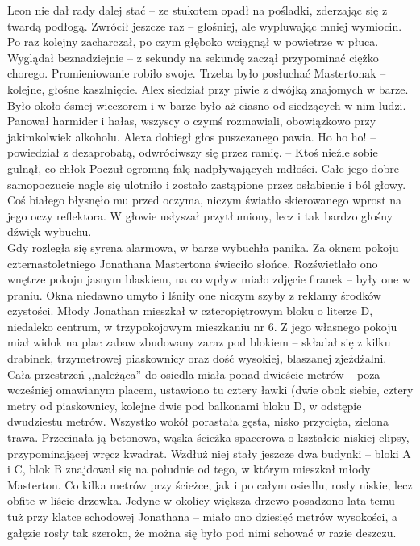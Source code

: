 \documentclass[../MAIN.tex]{subfiles}
\begin{document}
Leon nie dał rady dalej stać -- ze stukotem opadł na pośladki, zderzając się z twardą podłogą. Zwrócił jeszcze raz -- głośniej, ale wypluwając mniej wymiocin. Po raz kolejny zacharczał, po czym głęboko wciągnął w powietrze w płuca. Wyglądał beznadziejnie -- z sekundy na sekundę zaczął przypominać ciężko chorego. Promieniowanie robiło swoje.
\sx Trzeba było posłuchać Mastertona\3k -- kolejne, głośne kaszlnięcie.
\qd
Alex siedział przy piwie z dwójką znajomych w barze. Było około ósmej wieczorem i w barze było aż ciasno od siedzących w nim ludzi. Panował harmider i hałas, wszyscy o czymś rozmawiali, obowiązkowo przy jakimkolwiek alkoholu. Alexa dobiegł głos puszczanego pawia.
\sx Ho ho ho! -- powiedział z dezaprobatą, odwróciwszy się przez ramię. -- Ktoś nieźle sobie gulnął, co chło\3k \qd
Poczuł ogromną falę nadpływających mdłości. Całe jego dobre samopoczucie nagle się ulotniło i zostało zastąpione przez osłabienie i ból głowy. Coś białego błysnęło mu przed oczyma, niczym światło skierowanego wprost na jego oczy reflektora. W głowie usłyszał przytłumiony, lecz i tak bardzo głośny dźwięk wybuchu. \\
Gdy rozległa się syrena alarmowa, w barze wybuchła panika.
%
%
%
Za oknem pokoju czternastoletniego Jonathana Mastertona świeciło słońce. Rozświetlało ono wnętrze pokoju jasnym blaskiem, na co wpływ miało zdjęcie firanek -- były one w praniu. Okna niedawno umyto i lśniły one niczym szyby z reklamy środków czystości. Młody Jonathan mieszkał w czteropiętrowym bloku o literze D, niedaleko centrum, w trzypokojowym mieszkaniu nr 6. Z jego własnego pokoju miał widok na plac zabaw zbudowany zaraz pod blokiem -- składał się z kilku drabinek, trzymetrowej piaskownicy oraz dość wysokiej, blaszanej zjeżdżalni. \\
Cała przestrzeń ,,należąca'' do osiedla miała ponad dwieście metrów -- poza wcześniej omawianym placem, ustawiono tu cztery ławki (dwie obok siebie, cztery metry od piaskownicy, kolejne dwie pod balkonami bloku D, w odstępie dwudziestu metrów. Wszystko wokół porastała gęsta, nisko przycięta, zielona trawa. Przecinała ją betonowa, wąska ścieżka spacerowa o kształcie niskiej elipsy, przypominającej wręcz kwadrat. Wzdłuż niej stały jeszcze dwa budynki -- bloki A i C, blok B znajdował się na południe od tego, w którym mieszkał młody Masterton. Co kilka metrów przy ścieżce, jak i po całym osiedlu, rosły niskie, lecz obfite w liście drzewka. Jedyne w okolicy większa drzewo posadzono lata temu tuż przy klatce schodowej Jonathana -- miało ono dziesięć metrów wysokości, a gałęzie rosły tak szeroko, że można się było pod nimi schować w razie deszczu.
\end{document}
